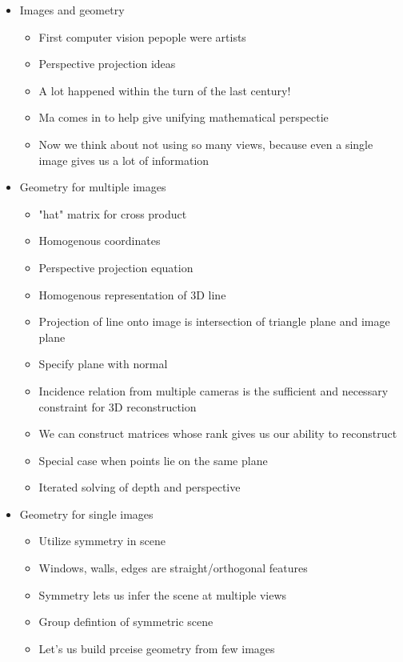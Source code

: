 \documentclass{report}
\begin{document}
    \begin{itemize}
        \item Images and geometry
        \begin{itemize}
            \item First computer vision pepople were artists
            \item Perspective projection ideas
            \item A lot happened within the turn of the last century!
            \item Ma comes in to help give unifying mathematical perspectie
            \item Now we think about not using so many views, because even a single image gives us a lot of information
        \end{itemize}
        \item Geometry for multiple images
        \begin{itemize}
            \item "hat" matrix for cross product
            \item Homogenous coordinates
            \item Perspective projection equation
            \item Homogenous representation of 3D line
            \item Projection of line onto image is intersection of triangle plane and image plane
            \item Specify plane with normal
            \item Incidence relation from multiple cameras is the sufficient and necessary constraint for 3D reconstruction
            \item We can construct matrices whose rank gives us our ability to reconstruct
            \item Special case when points lie on the same plane
            \item Iterated solving of depth and perspective
        \end{itemize}
        \item Geometry for single images
        \begin{itemize}
            \item Utilize symmetry in scene
            \item Windows, walls, edges are straight/orthogonal features
            \item Symmetry lets us infer the scene at multiple views
            \item Group defintion of symmetric scene %
            \item Let's us build prceise geometry from few images
        \end{itemize}
    \end{itemize}
\end{document}
